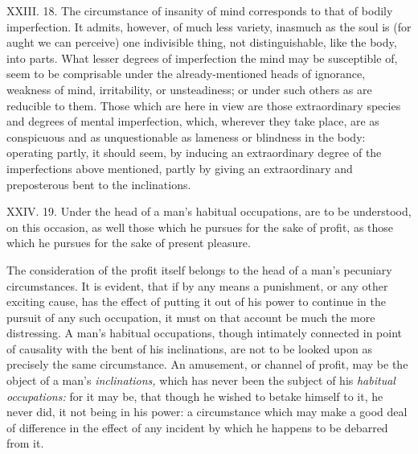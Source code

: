 \documentclass[12pt]{report}
\begin{document}
XXIII. 18. The circumstance of insanity of mind corresponds to that of
bodily imperfection. It admits, however, of much less variety, inasmuch
as the soul is (for aught we can perceive) one indivisible thing, not
distinguishable, like the body, into parts. What lesser degrees of
imperfection the mind may be susceptible of, seem to be comprisable
under the already-mentioned heads of ignorance, weakness of mind,
irritability, or unsteadiness; or under such others as are reducible to
them. Those which are here in view are those extraordinary species and
degrees of mental imperfection, which, wherever they take place, are as
conspicuous and as unquestionable as lameness or blindness in the body:
operating partly, it should seem, by inducing an extraordinary degree of
the imperfections above mentioned, partly by giving an extraordinary and
preposterous bent to the inclinations.

XXIV. 19. Under the head of a man's habitual occupations, are to be
understood, on this occasion, as well those which he pursues for the
sake of profit, as those which he pursues for the sake of present
pleasure.

The consideration of the profit itself belongs to the head of a man's
pecuniary circumstances. It is evident, that if by any means a
punishment, or any other exciting cause, has the effect of putting it
out of his power to continue in the pursuit of any such occupation, it
must on that account be much the more distressing. A man's habitual
occupations, though intimately connected in point of causality with the
bent of his inclinations, are not to be looked upon as precisely the
same circumstance. An amusement, or channel of profit, may be the object
of a man's \emph{inclinations,} which has never been the subject of his
\emph{habitual occupations:} for it may be, that though he wished to
betake himself to it, he never did, it not being in his power: a
circumstance which may make a good deal of difference in the effect of
any incident by which he happens to be debarred from it.
\end{document}
